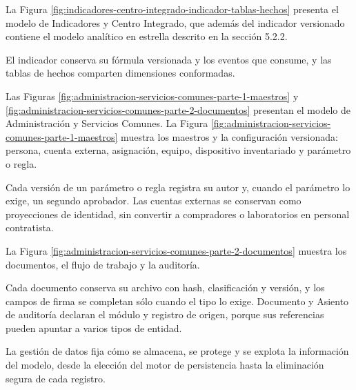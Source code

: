\documentclass[subdoc]{../../comun/overfore}
\begin{document}
La Figura \ref{fig:indicadores-centro-integrado-indicador-tablas-hechos} presenta el modelo de Indicadores y Centro Integrado, que además del indicador versionado contiene el modelo analítico en estrella descrito en la sección 5.2.2.

El indicador conserva su fórmula versionada y los eventos que consume, y las tablas de hechos comparten dimensiones conformadas.

Las Figuras \ref{fig:administracion-servicios-comunes-parte-1-maestros} y \ref{fig:administracion-servicios-comunes-parte-2-documentos} presentan el modelo de Administración y Servicios Comunes. La Figura \ref{fig:administracion-servicios-comunes-parte-1-maestros} muestra los maestros y la configuración versionada: persona, cuenta externa, asignación, equipo, dispositivo inventariado y parámetro o regla.

Cada versión de un parámetro o regla registra su autor y, cuando el parámetro lo exige, un segundo aprobador. Las cuentas externas se conservan como proyecciones de identidad, sin convertir a compradores o laboratorios en personal contratista.

La Figura \ref{fig:administracion-servicios-comunes-parte-2-documentos} muestra los documentos, el flujo de trabajo y la auditoría.

Cada documento conserva su archivo con hash, clasificación y versión, y los campos de firma se completan sólo cuando el tipo lo exige. Documento y Asiento de auditoría declaran el módulo y registro de origen, porque sus referencias pueden apuntar a varios tipos de entidad.

La gestión de datos fija cómo se almacena, se protege y se explota la información del modelo, desde la elección del motor de persistencia hasta la eliminación segura de cada registro.
\end{document}
